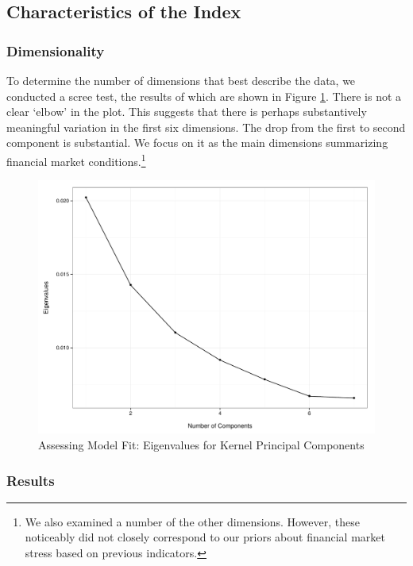 \documentclass[]{article}
\let\rmarkdownfootnote\footnote%
\def\footnote{\protect\rmarkdownfootnote}
\begin{document}
\subsection{Characteristics of the
Index}\label{characteristics-of-the-index}

\subsubsection{Dimensionality}\label{dimensionality}

To determine the number of dimensions that best describe the data, we
conducted a scree test, the results of which are shown in Figure
\ref{scree_plot}. There is not a clear `elbow' in the plot. This
suggests that there is perhaps substantively meaningful variation in the
first six dimensions. The drop from the first to second component is
substantial. We focus on it as the main dimensions summarizing financial
market conditions.\footnote{We also examined a number of the other
  dimensions. However, these noticeably did not closely correspond to
  our priors about financial market stress based on previous indicators.}

\begin{figure}
    \caption{Assessing Model Fit: Eigenvalues for Kernel Principal Components}
    \label{scree_plot}
    \begin{center}
        \includegraphics[scale=0.5]{analysis/figures/scree_plot.pdf}
    \end{center}
\end{figure}

\subsubsection{Results}\label{results}
\end{document}

